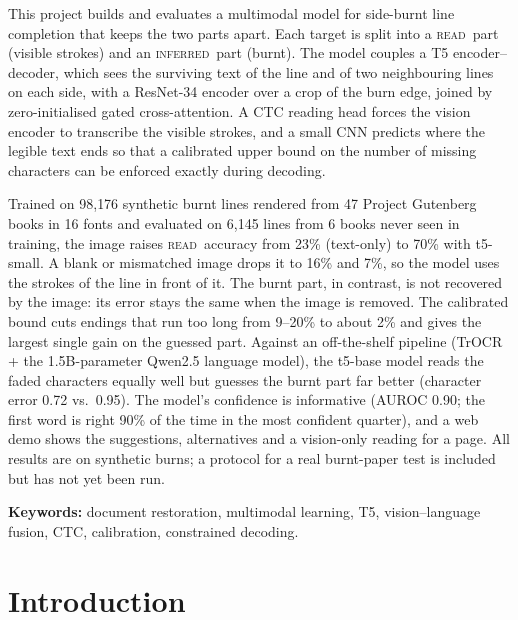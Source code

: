 \documentclass[12pt,a4paper,oneside]{report}
\newcommand{\READ}{\texorpdfstring{\textsc{read}}{READ}}
\newcommand{\INF}{\texorpdfstring{\textsc{inferred}}{INFERRED}}
\begin{document}
This project builds and evaluates a multimodal model for side-burnt line completion that keeps
the two parts apart. Each target is split into a \READ\ part (visible strokes) and an \INF\ part
(burnt). The model couples a T5 encoder--decoder, which sees the surviving text of the line and
of two neighbouring lines on each side, with a ResNet-34 encoder over a crop of the burn edge,
joined by zero-initialised gated cross-attention. A CTC reading head forces the vision encoder to
transcribe the visible strokes, and a small CNN predicts where the legible text ends so that a
calibrated upper bound on the number of missing characters can be enforced exactly during
decoding.

Trained on 98{,}176 synthetic burnt lines rendered from 47 Project Gutenberg books in 16 fonts
and evaluated on 6{,}145 lines from 6 books never seen in training, the image raises \READ\
accuracy from 23\% (text-only) to 70\% with t5-small. A blank or mismatched image drops it to
16\% and 7\%, so the model uses the strokes of the line in front of it. The burnt part, in
contrast, is not recovered by the image: its error stays the same when the image is removed.
The calibrated bound cuts endings that run too long from 9--20\% to about 2\% and gives the
largest single gain on the guessed part. Against an off-the-shelf pipeline (TrOCR + the
1.5B-parameter Qwen2.5 language model), the t5-base model reads the faded characters equally well
but guesses the burnt part far better (character error 0.72 vs.\ 0.95). The model's confidence is informative (AUROC 0.90; the
first word is right 90\% of the time in the most confident quarter), and a web demo shows the
suggestions, alternatives and a vision-only reading for a page. All results are on synthetic
burns; a protocol for a real burnt-paper test is included but has not yet been run.

\vspace{1em}\noindent\textbf{Keywords:} document restoration, multimodal learning, T5,
vision--language fusion, CTC, calibration, constrained decoding.

\tableofcontents
\listoftables
\listoffigures
{}

\clearpage\pagenumbering{arabic}
\chapter{Introduction}\label{ch:intro}
\end{document}
